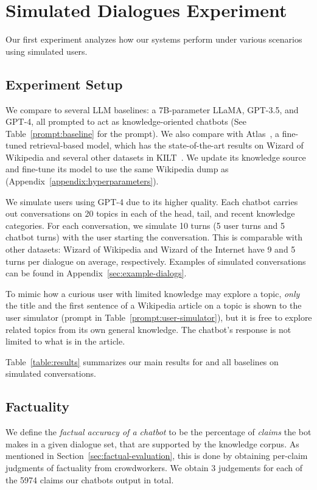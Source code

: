 \section{Simulated Dialogues Experiment}
Our first experiment analyzes how our systems perform under various scenarios using simulated users. 

\subsection{Experiment Setup}
We compare \system to several LLM baselines: a 7B-parameter LLaMA, GPT-3.5, and GPT-4, all prompted to act as knowledge-oriented chatbots (See Table~\ref{prompt:baseline} for the prompt).
We also compare with Atlas~\cite{izacard2022atlas}, a fine-tuned retrieval-based model, which has the state-of-the-art results on Wizard of Wikipedia and several other datasets in KILT~\cite{petroni-etal-2021-kilt}. 
We update its knowledge source and fine-tune its model to use the same Wikipedia dump 
as \system
(Appendix~\ref{appendix:hyperparameters}).

We simulate users using GPT-4 due to its higher quality. Each chatbot carries out conversations on 20 topics in each of the head, tail, and recent knowledge categories. For each conversation, we simulate 10 turns (5 user turns and 5 chatbot turns) with the user starting the conversation. This is comparable with other datasets: Wizard of Wikipedia and Wizard of the Internet have 9 and 5 turns per dialogue on average, respectively. 
Examples of simulated conversations can be found in Appendix~\ref{sec:example-dialogs}.

To mimic how a curious user with limited knowledge may explore a topic, {\em only} the title and the first sentence of a Wikipedia article on a topic is shown to the user simulator (prompt in Table~\ref{prompt:user-simulator}), but it is free to explore related topics from its own general knowledge.
The chatbot's response is not limited to what is in the article.

Table~\ref{table:results} summarizes our main results for \system and all baselines on simulated conversations.

\subsection{Factuality}
We define the {\em factual accuracy of a chatbot} 
to be the percentage of {\em claims} the bot makes in a given dialogue set, that are supported by the knowledge corpus.
As mentioned in Section~\ref{sec:factual-evaluation}, this is done by obtaining per-claim judgments of factuality from crowdworkers. We obtain 3 judgements for each of the 5974 claims our chatbots output in total.

